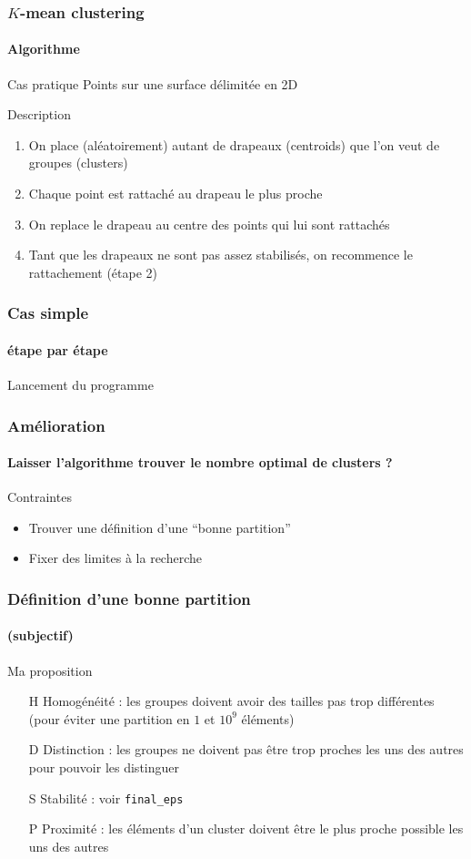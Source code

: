 \documentclass[]{beamer}
\begin{document}
\begin{frame}
  \frametitle{$K$-mean clustering}
  \framesubtitle{Algorithme}
  \begin{exampleblock}{Cas pratique}
    Points sur une surface délimitée en 2D
  \end{exampleblock}

  \begin{block}{Description}
  \begin{enumerate}
    \item On place (aléatoirement) autant de drapeaux (centroids) que l'on veut de groupes (clusters)
    \item Chaque point est rattaché au drapeau le plus proche
    \item On replace le drapeau au centre des points qui lui sont rattachés
    \item Tant que les drapeaux ne sont pas assez stabilisés, on recommence le rattachement (étape \alert{2})
  \end{enumerate}

  \end{block}

\end{frame}

\begin{frame}
  \frametitle{Cas simple}
  \framesubtitle{étape par étape}

  \vfill{}
  \alert{Lancement du programme}
  \vfill{}
\end{frame}

\begin{frame}
  \frametitle{Amélioration}
  \framesubtitle{Laisser l'algorithme trouver le nombre optimal de clusters ?}

  \begin{block}{Contraintes}
    \begin{itemize}
      \item Trouver une définition d'une ``bonne partition''
      \item Fixer des limites à la recherche
    \end{itemize}
  \end{block}
\end{frame}

\begin{frame}
  \frametitle{Définition d'une bonne partition}
  \framesubtitle{(subjectif)}

  \begin{block}{Ma proposition}
       \begin{itemize}
    \item[H] Homogénéité : les groupes doivent avoir des tailles pas trop différentes (pour éviter une partition en $1$ et $10^9$ éléments)
    \item[D] Distinction : les groupes ne doivent pas être trop proches les uns des autres pour pouvoir les distinguer
    \item[S] Stabilité : voir \tt{final\_eps}
    \item[P] Proximité : les éléments d'un cluster doivent être le plus proche possible les uns des autres
  \end{itemize}
  \end{block}
\end{frame}
\end{document}
